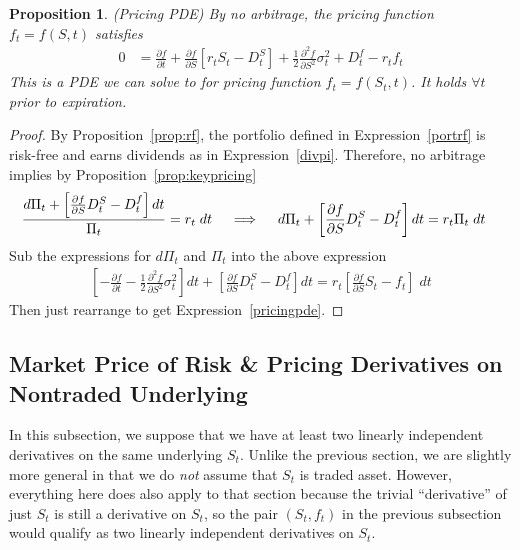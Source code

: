 \documentclass[12pt]{article}
\theoremstyle{plain}
\newtheorem{prop}[thm]{Proposition}
\theoremstyle{definition}
\theoremstyle{remark}
\begin{document}
\begin{prop}\emph{(Pricing PDE)}
\label{pdetraded}
By no arbitrage, the pricing function $f_t=f(S,t)$ satisfies
\begin{align}
  0
  &=
  \frac{\partial f}{\partial t}
  +
  \frac{\partial f}{\partial S}
  \left[
  r_t
  S_t
  - D_t^S
  \right]
  +
  \frac{1}{2}
  \frac{\partial^2 f}{\partial S^2}
  \sigma^2_t
  +
  D_t^f
  -
  r_t
  f_t
  \label{pricingpde}
\end{align}
This is a PDE we can solve to for pricing function $f_t=f(S_t,t)$. It
holds $\forall t$ prior to expiration.
\end{prop}
\begin{proof}
By Proposition~\ref{prop:rf}, the portfolio defined in
Expression~\ref{portrf} is risk-free and earns dividends as in
Expression~\ref{divpi}.
Therefore, no arbitrage implies by Proposition~\ref{prop:keypricing}
\begin{align*}
  \frac{%
    d\Pi_t +
    \left[
      \frac{\partial f}{\partial S} D_t^S - D_t^f
    \right]dt
  }{\Pi_t}
  &=
  r_t\;dt
  \quad\implies\quad
  d\Pi_t
  +
  \left[
    \frac{\partial f}{\partial S} D_t^S - D_t^f
  \right]dt
  =
  r_t\Pi_t\;dt
\end{align*}
Sub the expressions for $d\Pi_t$ and $\Pi_t$ into the above
expression
\begin{align*}
  \left[
  -
  \frac{\partial f}{\partial t}
  -
  \frac{1}{2}
  \frac{\partial^2 f}{\partial S^2}
  \sigma^2_t
  \right]
  dt
  +
  \left[
    \frac{\partial f}{\partial S} D_t^S - D_t^f
  \right]dt
  =
  r_t\left[
  \frac{\partial f}{\partial S}S_t
  -
  f_t
  \right]
  \;dt
\end{align*}
Then just rearrange to get Expression~\ref{pricingpde}.
\end{proof}

\clearpage
\subsection{Market Price of Risk \& Pricing Derivatives on Nontraded
Underlying}

In this subsection, we suppose that we have at least two linearly
independent derivatives on the same underlying $S_t$.
Unlike the previous section, we are slightly more general in that we do
\emph{not} assume that $S_t$ is traded asset.
However, everything here does also apply to that section because the
trivial ``derivative'' of just $S_t$ is still a derivative on $S_t$, so
the pair $(S_t,f_t)$ in the previous subsection would qualify as two
linearly independent derivatives on $S_t$.
\end{document}
